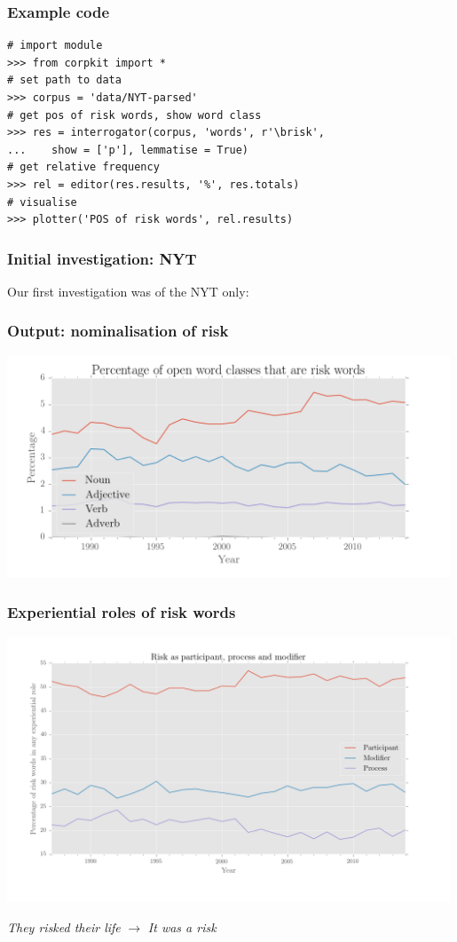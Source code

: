 \documentclass{beamer}       %
\begin{document}
\begin{frame}[fragile]
\frametitle{Example code}

\begin{verbatim}
# import module
>>> from corpkit import *
# set path to data
>>> corpus = 'data/NYT-parsed'
# get pos of risk words, show word class
>>> res = interrogator(corpus, 'words', r'\brisk', 
...    show = ['p'], lemmatise = True)
# get relative frequency
>>> rel = editor(res.results, '%', res.totals)
# visualise
>>> plotter('POS of risk words', rel.results)
\end{verbatim}

\end{frame}

\begin{frame}
\frametitle{Initial investigation: NYT}

Our first investigation was of the NYT only:

\end{frame}

\begin{frame}
    \frametitle{Output: nominalisation of risk}
    \centering
    \includegraphics[width=0.99\textwidth]{../../images/percentage-of-open-word-classes-that-are-risk-words}
\end{frame}

\begin{frame}
    \frametitle{Experiential roles of risk words}
    \centering
    \includegraphics[width=0.99\textwidth]{../../images/ppm_final_colour}

    \noindent \emph{They risked their life} $\rightarrow$ \emph{It was a risk}
\end{frame}
\end{document}
